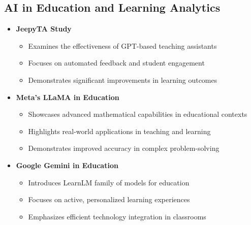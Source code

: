 \subsection{AI in Education and Learning Analytics}
\begin{itemize}
    \item \textbf{JeepyTA Study} \cite{jeepyta2024}
        \begin{itemize}
            \item Examines the effectiveness of GPT-based teaching assistants
            \item Focuses on automated feedback and student engagement
            \item Demonstrates significant improvements in learning outcomes
        \end{itemize}
    
    \item \textbf{Meta's LLaMA in Education} \cite{meta2024}
        \begin{itemize}
            \item Showcases advanced mathematical capabilities in educational contexts
            \item Highlights real-world applications in teaching and learning
            \item Demonstrates improved accuracy in complex problem-solving
        \end{itemize}
    
    \item \textbf{Google Gemini in Education} \cite{gemini2024}
        \begin{itemize}
            \item Introduces LearnLM family of models for education
            \item Focuses on active, personalized learning experiences
            \item Emphasizes efficient technology integration in classrooms
        \end{itemize}
\end{itemize}

